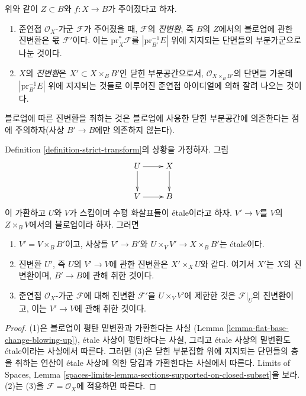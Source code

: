 \begin{definition}
\label{definition-strict-transform}
위와 같이 $Z \subset B$와 $f : X \to B$가 주어졌다고 하자.
\begin{enumerate}
\item 준연접 $\mathcal{O}_X$-가군 $\mathcal{F}$가 주어졌을 때,
$\mathcal{F}$의 {\it 진변환}, 즉 $B$의 $Z$에서의 블로업에 관한 진변환은
몫 $\mathcal{F}'$이다. 이는 $\text{pr}_X^*\mathcal{F}$를
$|\text{pr}_{B'}^{-1}E|$ 위에 지지되는 단면들의 부분가군으로 나눈 것이다.
\item $X$의 {\it 진변환}은
$X' \subset X \times_B B'$인 닫힌 부분공간으로서,
$\mathcal{O}_{X \times_B B'}$의 단면들 가운데
$|\text{pr}_{B'}^{-1}E|$ 위에 지지되는 것들로 이루어진 준연접 아이디얼에
의해 잘려 나오는 것이다.
\end{enumerate}
\end{definition}

\noindent
블로업에 따른 진변환을 취하는 것은 블로업에 사용한 닫힌 부분공간에
의존한다는 점에 주의하자(사상 $B' \to B$에만 의존하지 않는다).

\begin{lemma}
\label{lemma-strict-transform-local}
Definition \ref{definition-strict-transform}의 상황을 가정하자. 그림
$$
\xymatrix{
U \ar[r] \ar[d] & X \ar[d] \\
V \ar[r] & B
}
$$
이 가환하고 $U$와 $V$가 스킴이며 수평 화살표들이 \'etale이라고 하자.
$V' \to V$를 $V$의 $Z \times_B V$에서의 블로업이라 하자. 그러면
\begin{enumerate}
\item $V' = V \times_B B'$이고, 사상들
$V' \to B'$와 $U \times_V V' \to X \times_B B'$는 \'etale이다.
\item 진변환 $U'$, 즉 $U$의 $V' \to V$에 관한 진변환은
$X' \times_X U$와 같다. 여기서 $X'$는 $X$의 진변환이며,
$B' \to B$에 관해 취한 것이다.
\item 준연접 $\mathcal{O}_X$-가군 $\mathcal{F}$에 대해 진변환
$\mathcal{F}'$을 $U \times_V V'$에 제한한 것은 $\mathcal{F}|_U$의
진변환이고, 이는 $V' \to V$에 관해 취한 것이다.
\end{enumerate}
\end{lemma}

\begin{proof}
(1)은 블로업이 평탄 밑변환과 가환한다는 사실
(Lemma \ref{lemma-flat-base-change-blowing-up}), \'etale 사상이
평탄하다는 사실, 그리고 \'etale 사상의 밑변환도 \'etale이라는 사실에서
따른다. 그러면 (3)은 닫힌 부분집합 위에 지지되는 단면들의 층을 취하는
연산이 \'etale 사상에 의한 당김과 가환한다는 사실에서 따른다.
Limits of Spaces, Lemma
\ref{spaces-limits-lemma-sections-supported-on-closed-subset}을 보라.
(2)는 (3)을 $\mathcal{F} = \mathcal{O}_X$에 적용하면 따른다.
\end{proof}

